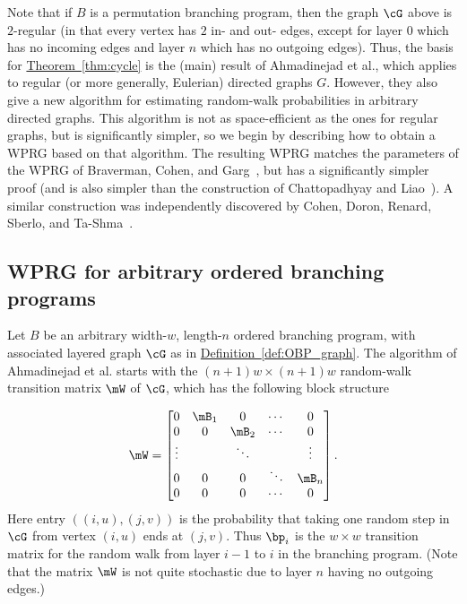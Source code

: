 \documentclass[11pt]{article}
\newcommand{\expref}[2]{\texorpdfstring{\hyperref[#2]{#1~\ref{#2}}}{#1~\ref{#2}}}
\begin{document}
    Note that if $B$ is a permutation branching program, then the graph $\cG$ above is $2$-regular (in that every vertex has $2$ in- and out- edges, except for layer $0$ which has no incoming edges and layer $n$ which has no outgoing edges).  Thus, the basis for \expref{Theorem}{thm:cycle} is the (main) result 
    of %
Ahmadinejad  %
et al., which applies to regular (or more generally, Eulerian) directed graphs $G$.
    However, they also give a new algorithm for estimating random-walk probabilities in arbitrary directed graphs.  This
    algorithm is not as space-efficient as the ones for regular graphs, but is significantly simpler, so we begin by describing how to
    obtain a WPRG based on that algorithm.  The resulting WPRG matches the parameters of the WPRG of Braverman, Cohen, and Garg~\cite{BravermanCoGa18}, but has a significantly simpler proof (and is also simpler than the construction of %
     Chattopadhyay %
     and Liao~\cite{ChattopadhyayLi20}). A similar construction was independently discovered by Cohen, Doron, Renard, Sberlo, and Ta-Shma~\cite{CohenDoReSbTa21}.
    
    \subsection{WPRG for arbitrary ordered branching programs}\label{subsec:OBP_overview}
    Let $B$ be an arbitrary width-$w$, length-$n$ ordered branching program, with associated layered graph $\cG$ as in \expref{Definition}{def:OBP_graph}.  The algorithm of
%
Ahmadinejad  %
et al. starts with the $(n+1)w\times (n+1)w$
%
random-walk transition matrix $\mW$ of $\cG$, which has the following block structure %

    $$\mW=
    \begin{bmatrix}
    0 & \mB_1 & 0 & \cdots & 0 \\
    0 & 0 & \mB_2 & \cdots & 0 \\
    \vdots & & \ddots & & \vdots\\
    0 & 0 & 0 & \ddots & \mB_n\\
    0 & 0 & 0 & \cdots &  0 \\
    \end{bmatrix}.$$ %
    Here entry $((i,u),(j,v))$ is the probability that taking one random step in $\cG$ from vertex $(i,u)$ ends at $(j,v)$.  Thus $\bp_i$ is the $w\times w$ transition matrix for the random walk from layer $i-1$ to $i$ in the branching program.
   (Note that the matrix $\mW$ is not quite stochastic due to layer $n$ having no
   outgoing edges.)
   
\end{document}
